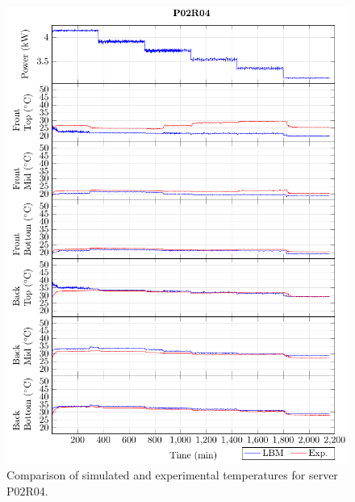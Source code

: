 \documentclass[border=10pt,preview]{standalone}
\begin{document}
\begin{figure}[!htb]
\centering
\includegraphics[width=\linewidth]{Plots/P02R04_T.pdf}
\caption{Comparison of simulated and experimental temperatures for server P02R04.}
\label{fig:P02R04_plot}
\end{figure}

\clearpage
\end{document}
